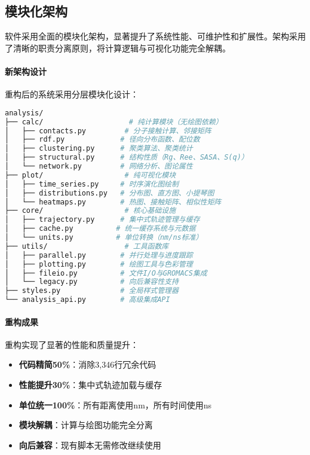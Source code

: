 \subsection{模块化架构}
\label{subsec:modular_architecture}

软件采用全面的模块化架构，显著提升了系统性能、可维护性和扩展性。架构采用了清晰的职责分离原则，将计算逻辑与可视化功能完全解耦。

\paragraph{新架构设计}

重构后的系统采用分层模块化设计：

\begin{lstlisting}[language=bash,style=blockstyle]
analysis/
├── calc/                    # 纯计算模块（无绘图依赖）
│   ├── contacts.py         # 分子接触计算、邻接矩阵
│   ├── rdf.py             # 径向分布函数、配位数
│   ├── clustering.py      # 聚类算法、聚类统计
│   ├── structural.py      # 结构性质（Rg、Ree、SASA、S(q)）
│   └── network.py         # 网络分析、图论属性
├── plot/                   # 纯可视化模块
│   ├── time_series.py     # 时序演化图绘制
│   ├── distributions.py   # 分布图、直方图、小提琴图
│   └── heatmaps.py        # 热图、接触矩阵、相似性矩阵
├── core/                   # 核心基础设施
│   ├── trajectory.py      # 集中式轨迹管理与缓存
│   ├── cache.py          # 统一缓存系统与元数据
│   └── units.py          # 单位转换（nm/ns标准）
├── utils/                  # 工具函数库
│   ├── parallel.py        # 并行处理与进度跟踪
│   ├── plotting.py        # 绘图工具与色彩管理
│   ├── fileio.py          # 文件I/O与GROMACS集成
│   └── legacy.py          # 向后兼容性支持
├── styles.py              # 全局样式管理器
└── analysis_api.py        # 高级集成API
\end{lstlisting}

\paragraph{重构成果}

重构实现了显著的性能和质量提升：

\begin{itemize}
    \item \textbf{代码精简50\%}：消除3,346行冗余代码
    \item \textbf{性能提升30\%}：集中式轨迹加载与缓存
    \item \textbf{单位统一100\%}：所有距离使用nm，所有时间使用ns
    \item \textbf{模块解耦}：计算与绘图功能完全分离
    \item \textbf{向后兼容}：现有脚本无需修改继续使用
\end{itemize}

